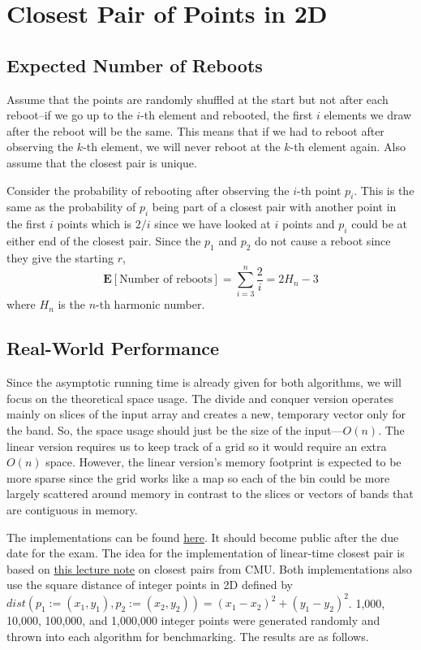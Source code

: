 \section{Closest Pair of Points in 2D}

\subsection{Expected Number of Reboots}

Assume that the points are randomly shuffled at the start but not after each reboot--if we go up to the $i$-th element and rebooted, the first $i$ elements we draw after the reboot will be the same. This means that if we had to reboot after observing the $k$-th element, we will never reboot at the $k$-th element again. Also assume that the closest pair is unique.

Consider the probability of rebooting after observing the $i$-th point $p_i$. This is the same as the probability of $p_i$ being part of a closest pair with another point in the first $i$ points which is $2/i$ since we have looked at $i$ points and $p_i$ could be at either end of the closest pair. Since the $p_1$ and $p_2$ do not cause a reboot since they give the starting $r$,
\[
  \mathbf{E}[\text{Number of reboots}] = \sum_{i=3}^n \frac{2}{i} = 2H_n - 3
\]
where $H_n$ is the $n$-th harmonic number.

\subsection{Real-World Performance}

Since the asymptotic running time is already given for both algorithms, we will focus on the theoretical space usage. The divide and conquer version operates mainly on slices of the input array and creates a new, temporary vector only for the band. So, the space usage should just be the size of the input---$O(n)$. The linear version requires us to keep track of a grid so it would require an extra $O(n)$ space. However, the linear version's memory footprint is expected to be more sparse since the grid works like a map so each of the bin could be more largely scattered around memory in contrast to the slices or vectors of bands that are contiguous in memory.

The implementations can be found \href{https://github.com/nngerncham/cs315_private/tree/main/final/cp_code02}{here}. It should become public after the due date for the exam. The idea for the implementation of linear-time closest pair is based on \href{https://www.cs.cmu.edu/~15451-s15/LectureNotes/lecture16/closest-pair.pdf}{this lecture note} on closest pairs from CMU. Both implementations also use the square distance of integer points in 2D defined by $dist(p_1 := (x_1, y_1), p_2 := (x_2, y_2)) = (x_1 - x_2)^2 + (y_1 - y_2)^2$. 1,000, 10,000, 100,000, and 1,000,000 integer points were generated randomly and thrown into each algorithm for benchmarking. The results are as follows.

